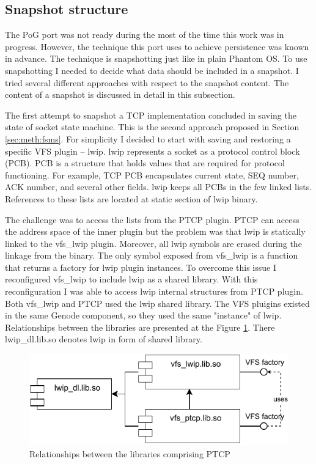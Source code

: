\subsection{Snapshot structure}

The PoG port was not ready during the most of the time this work was in
progress. However, the technique this port uses to achieve persistence was
known in advance. The technique is snapshotting just like in plain Phantom OS.
To use snapshotting I needed to decide what data should be included in a
snapshot. I tried several different approaches with respect to the snapshot
content. The content of a snapshot is discussed in detail in this subsection.

The first attempt to snapshot a TCP implementation concluded in saving the
state of socket state machine. This is the second approach proposed in Section
\ref{sec:meth:fsms}. For simplicity I decided to start with saving and
restoring a specific VFS plugin -- lwip. lwip represents a socket as a protocol
control block (PCB). PCB is a structure that holds values that are required for
protocol functioning. For example, TCP PCB encapsulates current state, SEQ
number, ACK number, and several other fields. lwip keeps all PCBs in the few
linked lists. References to these lists are located at static section of lwip
binary.

The challenge was to access the lists from the PTCP plugin. PTCP can access the
address space of the inner plugin but the problem was that lwip is statically
linked to the vfs\_lwip plugin. Moreover, all lwip symbols are erased during
the linkage from the binary. The only symbol exposed from vfs\_lwip is a
function that returns a factory for lwip plugin instances. To overcome this
issue I reconfigured vfs\_lwip to include lwip as a shared library. With this
reconfiguration I was able to access lwip internal structures from PTCP plugin.
Both vfs\_lwip and PTCP used the lwip shared library. The VFS pluigins existed
in the same Genode component, so they used the same "instance" of lwip.
Relationships between the libraries are presented at the Figure
\ref{fig:lib_deps}. There lwip\_dl.lib.so denotes lwip in form of shared
library.

\begin{figure}
    \centering
    \includegraphics[]{figs/ptcp_libs.pdf}
    \caption{Relationships between the libraries comprising PTCP}
    \label{fig:lib_deps}
\end{figure}

